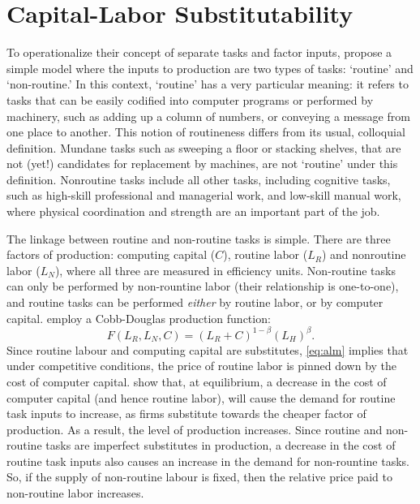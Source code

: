 \section{Capital-Labor Substitutability}

To operationalize their concept of separate tasks and factor inputs, \citet{Levy2003} propose a simple model where the inputs to production are two types of tasks: `routine' and `non-routine.' In this context, `routine' has a very particular meaning: it refers to tasks that can be easily codified into computer programs or performed by machinery, such as adding up a column of numbers, or conveying a message from one place to another. This notion of routineness differs from its usual, colloquial definition. Mundane tasks such as sweeping a floor or stacking shelves, that are not (yet!) candidates for replacement by machines, are not `routine' under this definition. Nonroutine tasks include all other tasks, including cognitive tasks, such as high-skill professional and managerial work, and low-skill manual work, where physical coordination and strength are an important part of the job. 

The linkage between routine and non-routine tasks is simple. There are three factors of production: computing capital ($C$), routine labor ($L_R$) and nonroutine labor ($L_N$), where all three are measured in efficiency units. Non-routine tasks can only be performed by non-rountine labor (their relationship is one-to-one), and routine tasks can be performed {\em either} by routine labor, or by computer capital. \citet{Levy2003} employ a Cobb-Douglas production function:
\begin{equation}\label{eq:alm}
  F(L_R, L_N, C) = \left(L_R + C\right)^{1-\beta}\left(L_H\right)^\beta.
\end{equation}
Since routine labour and computing capital are substitutes, \eqref{eq:alm} implies that under competitive conditions, the price of routine labor is pinned down by the cost of computer capital. \citet{Levy2003} show that, at equilibrium, a decrease in the cost of computer capital (and hence routine labor), will cause the demand for routine task inputs to increase, as firms substitute towards the cheaper factor of production. As a result, the level of production increases. Since routine and non-routine tasks are imperfect substitutes in production, a decrease in the cost of routine task inputs also causes an increase in the demand for non-rountine tasks. So, if the supply of non-routine labour is fixed, then the relative price paid to non-routine labor increases.

